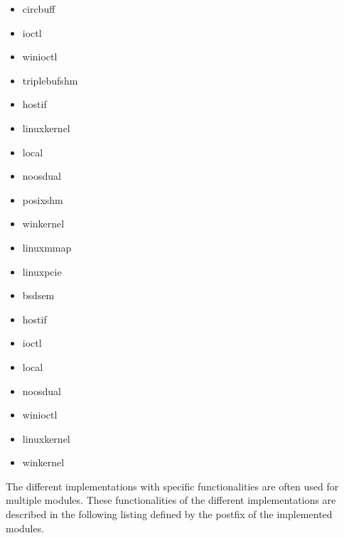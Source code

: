 \begin{description}[leftmargin=0cm]
    \item[DLL] \mbox{}
    \begin{multicols}{3}
        \begin{itemize}
            \item circbuff
            \item ioctl
            \item winioctl
        \end{itemize}
    \end{multicols}
    
    \item[PDO] \mbox{}
    \begin{multicols}{3}
        \begin{itemize}
            \item triplebufshm
            \item hostif
            \item linuxkernel
            \item local
            \item noosdual
            \item posixshm
            \item winkernel
            \item linuxmmap
            \item linuxpcie
        \end{itemize}
    \end{multicols}
    
    \item[time sync] \mbox{}
    \begin{multicols}{3}
        \begin{itemize}
            \item bsdsem
            \item hostif
            \item ioctl
            \item local
            \item noosdual
            \item winioctl
            \item linuxkernel
            \item winkernel
        \end{itemize}
    \end{multicols}
\end{description}

The different implementations with specific functionalities are often used for multiple modules.
These functionalities of the different implementations are described in the following listing defined by the postfix of the implemented modules.

